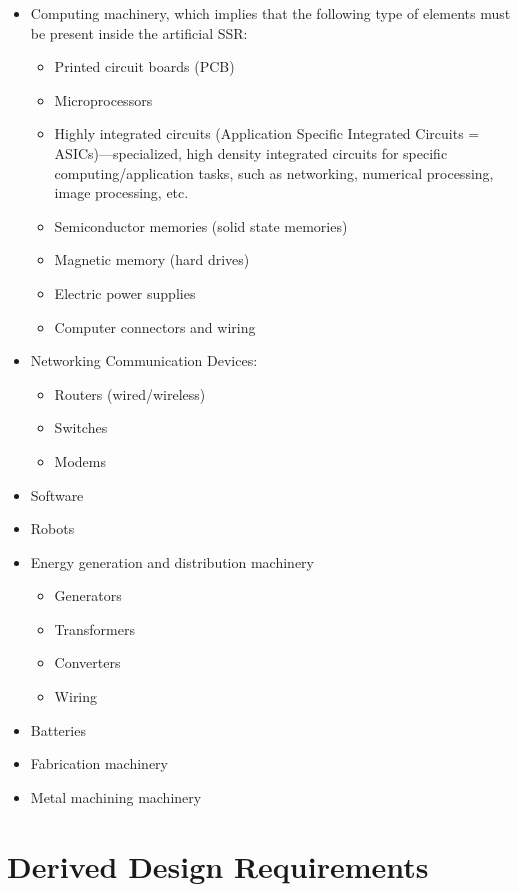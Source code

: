 \begin{itemize}
\item Computing machinery, which implies that the following type of
elements must be present inside the artificial SSR:

\begin{itemize}
\item Printed circuit boards (PCB)
\item Microprocessors
\item Highly integrated circuits (Application Specific Integrated
Circuits = ASICs)---specialized, high density integrated circuits for
specific computing/application tasks, such as networking, numerical processing,
image processing, etc.
\item Semiconductor memories (solid state memories)
\item Magnetic memory (hard drives)
\item Electric power supplies
\item Computer connectors and wiring
\end{itemize}
\item Networking Communication Devices:

\begin{itemize}
\item Routers (wired/wireless)
\item Switches
\item Modems
\end{itemize}
\item Software
\item Robots
\item Energy generation and distribution machinery

\begin{itemize}
\item Generators
\item Transformers
\item Converters
\item Wiring
\end{itemize}
\item Batteries
\item Fabrication machinery
\item Metal machining machinery
\end{itemize}

\section{Derived Design Requirements}

